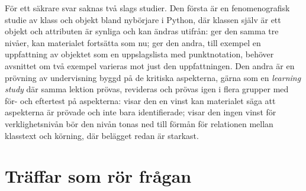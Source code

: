 För ett säkrare svar saknas två slags studier.  Den första är en
fenomenografisk studie av klass och objekt bland nybörjare i Python, där
klassen själv är ett objekt och attributen är synliga och kan ändras
utifrån: ger den samma tre nivåer, kan materialet fortsätta som nu; ger
den andra, till exempel en uppfattning av objektet som en uppslagslista
med punktnotation, behöver avsnittet om två exempel varieras mot just den
uppfattningen.  Den andra är en prövning av undervisning byggd på de
kritiska aspekterna, gärna som en \emph{learning study} där samma
lektion prövas, revideras och prövas igen i flera grupper med för- och
eftertest på aspekterna: visar den en vinst kan materialet säga att
aspekterna är prövade och inte bara identifierade; visar den ingen vinst
för verklighetsnivån bör den nivån tonas ned till förmån för relationen
mellan klasstext och körning, där belägget redan är starkast.

\section{Träffar som rör frågan}
\label{sec:fen-traffar}

